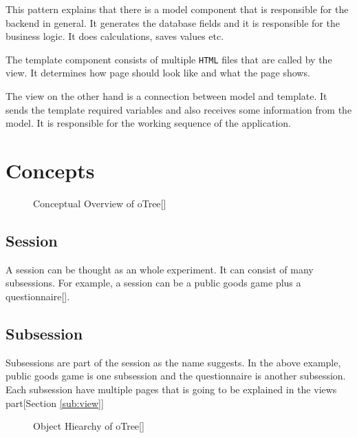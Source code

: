This pattern explains that there is a model component that is responsible for the backend in general. It generates the database fields and it is responsible for the business logic. It does calculations, saves values etc.

The template component consists of multiple \verb|HTML| files that are called by the view. It determines how page should look like and what the page shows.

The view on the other hand is a connection between model and template. It sends the template required variables and also receives some information from the model. It is responsible for the working sequence of the application.

\section{Concepts}

\begin{figure}[h]
	\centerline{}
	\caption{Conceptual Overview of oTree[\cite{oTreeConcepts2017}]}
	\label{fig:picture3}
	
\end{figure}

\subsection{Session}

A session can be thought as an whole experiment. It can consist of many subsessions. For example, a session can be a public goods game plus a questionnaire[\cite{oTreeConcepts2017}].

\subsection{Subsession}

Subsessions are part of the session as the name suggests. In the above example, public goods game is one subsession and the questionnaire is another subsession. Each subsession have multiple pages that is going to be explained in the views part[Section \ref{sub:view}]

\begin{figure}[h]
	\centerline{}
	\caption{Object Hiearchy of oTree[\cite{oTreeConcepts2017}]}
	\label{fig:picture4}
	
\end{figure}

